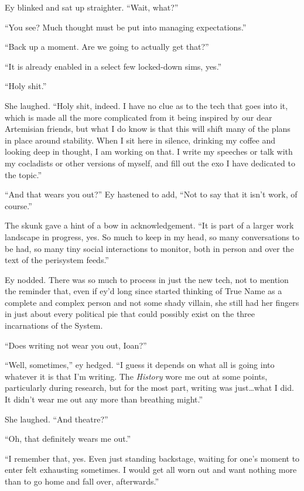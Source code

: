 Ey blinked and sat up straighter. ``Wait, what?''

``You see? Much thought must be put into managing expectations.''

``Back up a moment. Are we going to actually get that?''

``It is already enabled in a select few locked-down sims, yes.''

``Holy shit.''

She laughed. ``Holy shit, indeed. I have no clue as to the tech that goes into it, which is made all the more complicated from it being inspired by our dear Artemisian friends, but what I do know is that this will shift many of the plans in place around stability. When I sit here in silence, drinking my coffee and looking deep in thought, I am working on that. I write my speeches or talk with my cocladists or other versions of myself, and fill out the exo I have dedicated to the topic.''

``And that wears you out?'' Ey hastened to add, ``Not to say that it isn't work, of course.''

The skunk gave a hint of a bow in acknowledgement. ``It is part of a larger work landscape in progress, yes. So much to keep in my head, so many conversations to be had, so many tiny social interactions to monitor, both in person and over the text of the perisystem feeds.''

Ey nodded. There was so much to process in just the new tech, not to mention the reminder that, even if ey'd long since started thinking of True Name as a complete and complex person and not some shady villain, she still had her fingers in just about every political pie that could possibly exist on the three incarnations of the System.

``Does writing not wear you out, Ioan?''

``Well, sometimes,'' ey hedged. ``I guess it depends on what all is going into whatever it is that I'm writing. The \emph{History} wore me out at some points, particularly during research, but for the most part, writing was just\ldots what I did. It didn't wear me out any more than breathing might.''

She laughed. ``And theatre?''

``Oh, that definitely wears me out.''

``I remember that, yes. Even just standing backstage, waiting for one's moment to enter felt exhausting sometimes. I would get all worn out and want nothing more than to go home and fall over, afterwards.''

